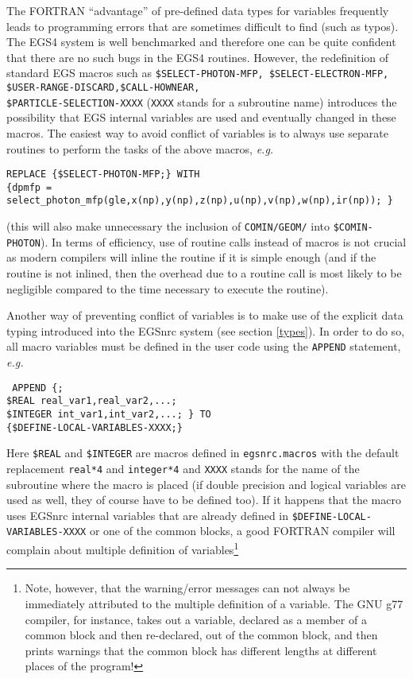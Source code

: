 The FORTRAN ``advantage'' of pre-defined data types for
variables frequently leads to programming errors that are
sometimes difficult to find (such as typos).
The EGS4 system is well benchmarked
and therefore one can be quite confident that there are no
such bugs in the EGS4 routines. However, the
redefinition of standard EGS macros such as
{\tt \$SELECT-PHOTON-MFP, \$SELECT-ELECTRON-MFP,
\$USER-RANGE-DISCARD,\$CALL-HOWNEAR,\\ \$PARTICLE-SELECTION-XXXX}
({\tt XXXX} stands for a subroutine name) introduces the possibility
that EGS internal variables are used and eventually changed in
these macros. The easiest way to avoid conflict of variables is
to always use separate routines to perform the tasks of the
above macros, {\em e.g.}
\begin{flushleft}
{\tt REPLACE \{\$SELECT-PHOTON-MFP;\} WITH \\
\{dpmfp = select\_photon\_mfp(gle,x(np),y(np),z(np),u(np),v(np),w(np),ir(np));
\} }\\
\end{flushleft}

\noindent
(this will also make unnecessary the inclusion of
{\tt COMIN/GEOM/} into {\tt \$COMIN-PHOTON}). In terms of efficiency,
use of routine calls instead of macros is not crucial as
modern compilers will inline the routine if it is simple enough
(and if the routine is not inlined, then the overhead
due to a routine call is most likely to be negligible compared
to the time necessary to execute the routine).

Another way of preventing conflict of variables is to make
use of the explicit data typing introduced into the EGSnrc system
(see section \ref{types}). In order to do so, all macro variables
must be defined in the user code using the {\tt APPEND} statement,
{\em e.g.}
\begin{flushleft}
{\tt
APPEND \{;\\
\$REAL real\_var1,real\_var2,...;\\
\$INTEGER int\_var1,int\_var2,...; \}
\tt TO\\
\{\$DEFINE-LOCAL-VARIABLES-XXXX;\} }\\
\end{flushleft}

\noindent
Here {\tt \$REAL} and {\tt \$INTEGER} are macros defined in {\tt egsnrc.macros}
with the default replacement {\tt real*4} and {\tt integer*4} and
{\tt XXXX} stands for the name of the subroutine where the macro
is placed (if
double precision and logical variables are used as well, they of course
have to be defined too). If it happens that the macro uses EGSnrc internal
variables that are already defined in
{\tt \$DEFINE-LOCAL-VARIABLES-XXXX} or one of the common blocks,
a good FORTRAN compiler will
complain about multiple definition of variables\footnote{
Note, however, that the warning/error messages can not
always be immediately attributed to the multiple definition of
a variable. The GNU g77 compiler, for instance, takes out
a variable, declared as a member of a common block and then re-declared,
out of the common block, and then prints warnings that the
common block has different lengths at different places of the
program!}

